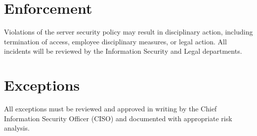 \section{Enforcement}
Violations of the server security policy may result in disciplinary action, including termination of access, employee disciplinary measures, or legal action. All incidents will be reviewed by the Information Security and Legal departments.

\section{Exceptions}
All exceptions must be reviewed and approved in writing by the Chief Information Security Officer (CISO) and documented with appropriate risk analysis.

